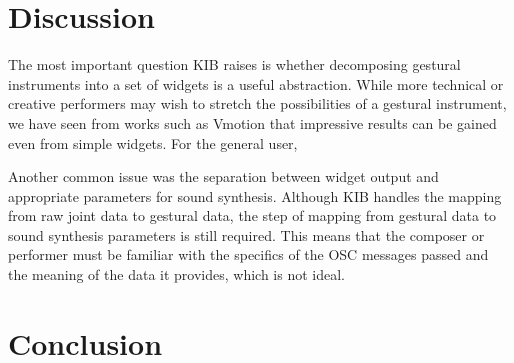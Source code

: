 \documentclass{nime-alternate}
\begin{document}
\section{Discussion}
The most important question KIB raises is whether decomposing gestural instruments into a
set of widgets is a useful abstraction. While more technical or creative performers may wish
to stretch the possibilities of a gestural instrument, we have seen from works such as Vmotion
that impressive results can be gained even from simple widgets. For the general user, 

Another common issue was the separation between widget output and appropriate parameters for
sound synthesis. Although KIB handles the mapping from raw joint data to gestural data, the
step of mapping from gestural data to sound synthesis parameters is still required. This means
that the composer or performer must be familiar with the specifics of the OSC messages passed
and the meaning of the data it provides, which is not ideal.
\section{Conclusion}


%
\end{document}

